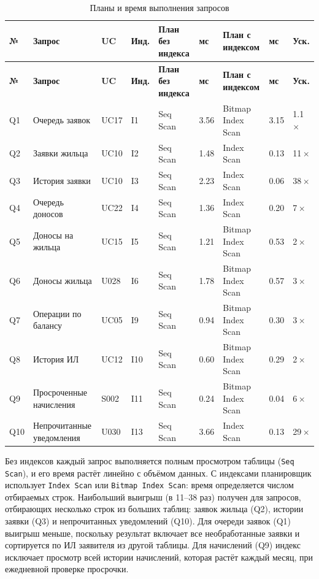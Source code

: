 \documentclass[12pt,a4paper]{article}
\begin{document}
\begingroup\small
\begin{longtable}{L{7.5mm} L{28.1mm} L{10.3mm} L{7.5mm} L{16.9mm} L{11.3mm} L{26.3mm} L{11.3mm} L{11.3mm}}
\caption{Планы и время выполнения запросов}\label{tab:explain}\\
\toprule \textbf{№} & \textbf{Запрос} & \textbf{UC} & \textbf{Инд.} & \textbf{План без индекса} & \textbf{мс} & \textbf{План с индексом} & \textbf{мс} & \textbf{Уск.} \\ \midrule
\endfirsthead
\toprule \textbf{№} & \textbf{Запрос} & \textbf{UC} & \textbf{Инд.} & \textbf{План без индекса} & \textbf{мс} & \textbf{План с индексом} & \textbf{мс} & \textbf{Уск.} \\ \midrule
\endhead
\bottomrule
\endfoot
Q1 & Очередь заявок & UC17 & I1 & Seq Scan & 3.56 & Bitmap Index Scan & 3.15 & 1.1\,$\times$ \\
Q2 & Заявки жильца & UC10 & I2 & Seq Scan & 1.48 & Index Scan & 0.13 & 11\,$\times$ \\
Q3 & История заявки & UC10 & I3 & Seq Scan & 2.23 & Index Scan & 0.06 & 38\,$\times$ \\
Q4 & Очередь доносов & UC22 & I4 & Seq Scan & 1.36 & Index Scan & 0.20 & 7\,$\times$ \\
Q5 & Доносы на жильца & UC15 & I5 & Seq Scan & 1.21 & Bitmap Index Scan & 0.53 & 2\,$\times$ \\
Q6 & Доносы жильца & U028 & I6 & Seq Scan & 1.78 & Bitmap Index Scan & 0.57 & 3\,$\times$ \\
Q7 & Операции по балансу & UC05 & I9 & Seq Scan & 0.94 & Bitmap Index Scan & 0.30 & 3\,$\times$ \\
Q8 & История ИЛ & UC12 & I10 & Seq Scan & 0.60 & Bitmap Index Scan & 0.29 & 2\,$\times$ \\
Q9 & Просроченные начисления & S002 & I11 & Seq Scan & 0.24 & Bitmap Index Scan & 0.04 & 6\,$\times$ \\
Q10 & Непрочитанные уведомления & U030 & I13 & Seq Scan & 3.66 & Index Scan & 0.13 & 29\,$\times$ \\
\end{longtable}
\endgroup
Без индексов каждый запрос выполняется полным просмотром таблицы (\texttt{Seq Scan}), и его
время растёт линейно с объёмом данных. С индексами планировщик использует
\texttt{Index Scan} или \texttt{Bitmap Index Scan}: время определяется числом отбираемых строк.
Наибольший выигрыш (в 11--38 раз) получен для запросов, отбирающих несколько строк из больших
таблиц: заявок жильца (Q2), истории заявки (Q3) и непрочитанных уведомлений (Q10).
Для очереди заявок (Q1) выигрыш меньше, поскольку результат включает все необработанные заявки
и сортируется по ИЛ заявителя из другой таблицы. Для начислений (Q9) индекс исключает
просмотр всей истории начислений, которая растёт каждый месяц, при ежедневной проверке просрочки.
\end{document}
